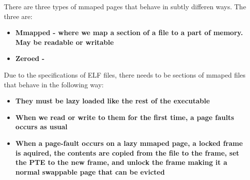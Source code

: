 \documentclass{report}
\newcommand{\bullpara}[2]{\item \textbf{#1} \ #2}
\newcommand{\compitem}[1]{\begin{itemize}\setlength\itemsep{-0.1em}#1\end{itemize}}
\begin{document}
				There are three types of mmaped pages that behave in subtly differen ways. The three are:
				\compitem{
					\bullpara{Mmapped - where we map a section of a file to a part of memory. May be readable or writable}{}
					\bullpara{Zeroed - }{}
				}
				
				Due to the specifications of ELF files, there needs to be sections of mmaped files that behave in the
				following way:
				\compitem{
					\bullpara{They must be lazy loaded like the rest of the executable}{}
					\bullpara{When we read or write to them for the first time, a page faults occurs as usual}{}
					\bullpara{When a page-fault occurs on a lazy mmaped page, a locked frame is aquired, the contents are copied
					from the file to the frame, set the PTE to the new frame, and unlock the frame making it a normal swappable
					page that can be evicted}{}
				}

				
\end{document}
